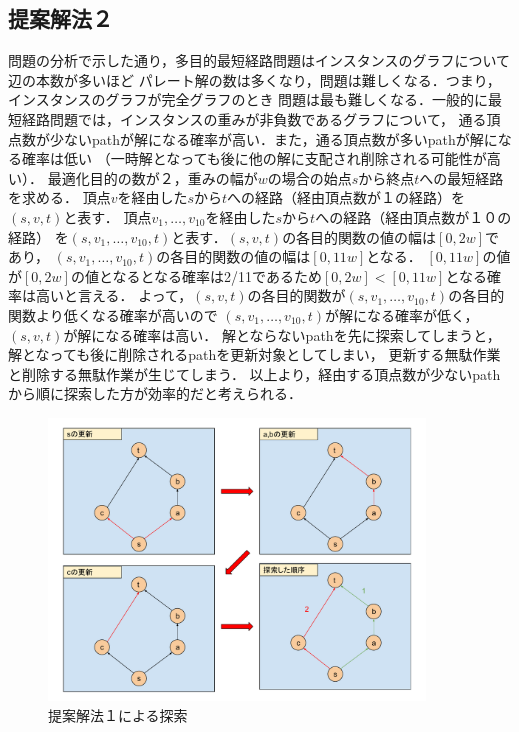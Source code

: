 \documentclass[12pt]{optlab-bachelor}
\begin{document}
\subsection{提案解法２}

問題の分析で示した通り，多目的最短経路問題はインスタンスのグラフについて辺の本数が多いほど
パレート解の数は多くなり，問題は難しくなる．つまり，インスタンスのグラフが完全グラフのとき
問題は最も難しくなる．一般的に最短経路問題では，インスタンスの重みが非負数であるグラフについて，
通る頂点数が少ないpathが解になる確率が高い．また，通る頂点数が多いpathが解になる確率は低い
（一時解となっても後に他の解に支配され削除される可能性が高い）．
最適化目的の数が２，重みの幅が$w$の場合の始点$s$から終点$t$への最短経路を求める．
頂点$v$を経由した$s$から$t$への経路（経由頂点数が１の経路）を$(s,v,t)$と表す．
頂点$v_1,\ldots,v_10$を経由した$s$から$t$への経路（経由頂点数が１０の経路）
を$(s,v_1,\ldots,v_10,t)$と表す．$(s,v,t)$の各目的関数の値の幅は$[0,2w]$であり，
$(s,v_1,\ldots,v_10,t)$の各目的関数の値の幅は$[0,11w]$となる．
$[0,11w]$の値が$[0,2w]$の値となるとなる確率は2/11であるため$[0,2w]<[0,11w]$となる確率は高いと言える．
よって，$(s,v,t)$の各目的関数が$(s,v_1,\ldots,v_10,t)$の各目的関数より低くなる確率が高いので
$(s,v_1,\ldots,v_10,t)$が解になる確率が低く，$(s,v,t)$が解になる確率は高い．
解とならないpathを先に探索してしまうと，解となっても後に削除されるpathを更新対象としてしまい，
更新する無駄作業と削除する無駄作業が生じてしまう．
以上より，経由する頂点数が少ないpathから順に探索した方が効率的だと考えられる．



\begin{figure}[htbp]
  \centering
  \caption{提案解法１による探索}
  \includegraphics[width=10.0cm]{fig/fig6.pdf}
\end{figure}
\end{document}
